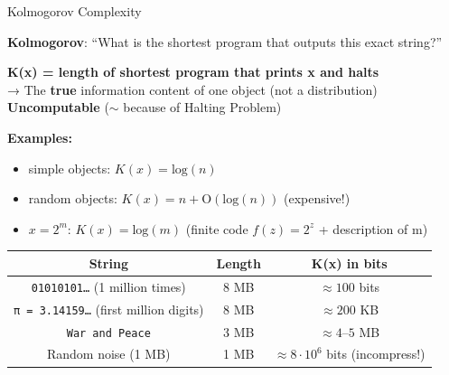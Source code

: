 \documentclass{beamer}
\begin{document}
\begin{frame}{Kolmogorov Complexity }

\vspace{.1cm}
\textbf{Kolmogorov}: ``What is the shortest program that outputs this exact string?''

\bigskip 

\textcolor{new_turquoise}{\textbf{K(x) = length of shortest program that prints x and halts}}\\

\medskip
→ The \textbf{true} information content of one object (not a distribution)\\

\medskip
{\textbf{Uncomputable}} ($\sim$ because of Halting Problem)\\
\scriptsize

\vspace{.5cm}
{\bf Examples:}
\begin{itemize}
    \item simple objects: $K(x)=\mathrm{log}(n)$
    \item random objects: $K(x) = n +\mathrm{O}(\mathrm{log}(n))$ (expensive!)
    \item $x = 2^m$: $K(x) = \mathrm{log}(m) $ (finite code $f(z)=2^z$ + description of m)
\end{itemize}
\smallskip
\begin{tabular}{c|c|c}
String & Length & K(x) in bits \\ \hline
\texttt{01010101…} (1 million times) & 8 MB & $\approx 100$ bits \\
\texttt{π = 3.14159…} (first million digits) & 8 MB & $\approx 200$ KB \\
\texttt{War and Peace} & 3 MB & $\approx 4–5$ MB \\
Random noise (1 MB) & 1 MB & $\approx 8\cdot10^6$ bits (incompress!)
\end{tabular}

\end{frame}
\end{document}
